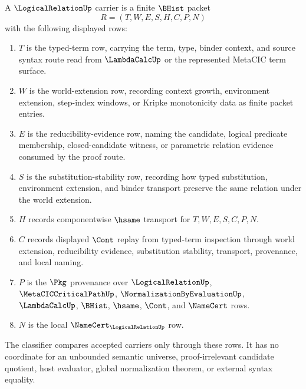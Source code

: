 \begin{definition}\label{def:logical-relation-carrier}
A $\LogicalRelationUp$ carrier is a finite $\BHist$ packet
$$
R=(T,W,E,S,H,C,P,N)
$$
with the following displayed rows:
\begin{enumerate}
\item $T$ is the typed-term row, carrying the term, type, binder context, and source syntax route read from $\LambdaCalcUp$ or the represented MetaCIC term surface.
\item $W$ is the world-extension row, recording context growth, environment extension, step-index windows, or Kripke monotonicity data as finite packet entries.
\item $E$ is the reducibility-evidence row, naming the candidate, logical predicate membership, closed-candidate witness, or parametric relation evidence consumed by the proof route.
\item $S$ is the substitution-stability row, recording how typed substitution, environment extension, and binder transport preserve the same relation under the world extension.
\item $H$ records componentwise $\hsame$ transport for $T,W,E,S,C,P,N$.
\item $C$ records displayed $\Cont$ replay from typed-term inspection through world extension, reducibility evidence, substitution stability, transport, provenance, and local naming.
\item $P$ is the $\Pkg$ provenance over $\LogicalRelationUp$, $\MetaCICCriticalPathUp$, $\NormalizationByEvaluationUp$, $\LambdaCalcUp$, $\BHist$, $\hsame$, $\Cont$, and $\NameCert$ rows.
\item $N$ is the local $\NameCert_{\LogicalRelationUp}$ row.
\end{enumerate}
The classifier compares accepted carriers only through these rows. It has no coordinate for an unbounded semantic universe, proof-irrelevant candidate quotient, host evaluator, global normalization theorem, or external syntax equality.
\end{definition}

